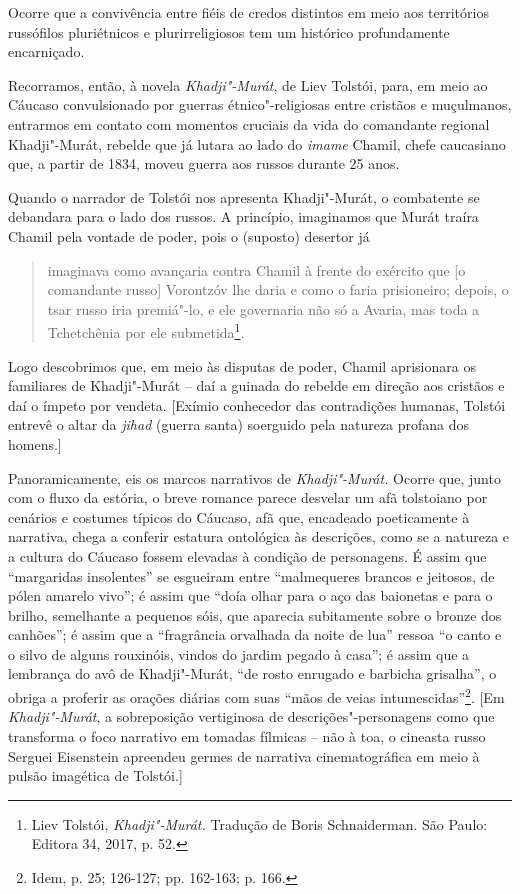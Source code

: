Ocorre que a convivência entre fiéis de credos distintos em meio aos
territórios russófilos pluriétnicos e plurirreligiosos tem um histórico
profundamente encarniçado.

Recorramos, então, à novela \emph{Khadji"-Murát}, de Liev Tolstói, para,
em meio ao Cáucaso convulsionado por guerras étnico"-religiosas entre
cristãos e muçulmanos, entrarmos em contato com momentos cruciais da
vida do comandante regional Khadji"-Murát, rebelde que já lutara ao lado
do \emph{imame} Chamil, chefe caucasiano que, a partir de 1834, moveu
guerra aos russos durante 25 anos.

Quando o narrador de Tolstói nos apresenta Khadji"-Murát, o combatente se
debandara para o lado dos russos. A princípio, imaginamos que Murát
traíra Chamil pela vontade de poder, pois o (suposto) desertor já

\begin{quote}
imaginava como avançaria contra Chamil à frente do exército que {[}o
comandante russo{]} Vorontzóv lhe daria e como o faria prisioneiro;
depois, o tsar russo iria premiá"-lo, e ele governaria não só a Avaria,
mas toda a Tchetchênia por ele submetida\footnote{Liev Tolstói,
  \emph{Khadji"-Murát.} Tradução de Boris Schnaiderman. São Paulo:
  Editora 34, 2017, p. 52.}.
\end{quote}

Logo descobrimos que, em meio às disputas de poder, Chamil aprisionara
os familiares de Khadji"-Murát -- daí a guinada do rebelde em direção aos
cristãos e daí o ímpeto por vendeta. {[}Exímio conhecedor das
contradições humanas, Tolstói entrevê o altar da \emph{jihad} (guerra
santa) soerguido pela natureza profana dos homens.{]}

Panoramicamente, eis os marcos narrativos de \emph{Khadji"-Murát.} Ocorre
que, junto com o fluxo da estória, o breve romance parece desvelar um
afã tolstoiano por cenários e costumes típicos do Cáucaso, afã que,
encadeado poeticamente à narrativa, chega a conferir estatura ontológica
às descrições, como se a natureza e a cultura do Cáucaso fossem elevadas
à condição de personagens. É assim que ``margaridas insolentes'' se
esgueiram entre ``malmequeres brancos e jeitosos, de pólen amarelo
vivo''; é assim que ``doía olhar para o aço das baionetas e para o
brilho, semelhante a pequenos sóis, que aparecia subitamente sobre o
bronze dos canhões''; é assim que a ``fragrância orvalhada da noite de
lua'' ressoa ``o canto e o silvo de alguns rouxinóis, vindos do jardim
pegado à casa''; é assim que a lembrança do avô de Khadji"-Murát, ``de
rosto enrugado e barbicha grisalha'', o obriga a proferir as orações
diárias com suas ``mãos de veias intumescidas''\footnote{Idem, p. 25;
  126-127; pp. 162-163; p. 166.}. {[}Em \emph{Khadji"-Murát}, a
sobreposição vertiginosa de descrições"-personagens como que transforma o
foco narrativo em tomadas fílmicas -- não à toa, o cineasta russo
Serguei Eisenstein apreendeu germes de narrativa cinematográfica em meio
à pulsão imagética de Tolstói.{]}

